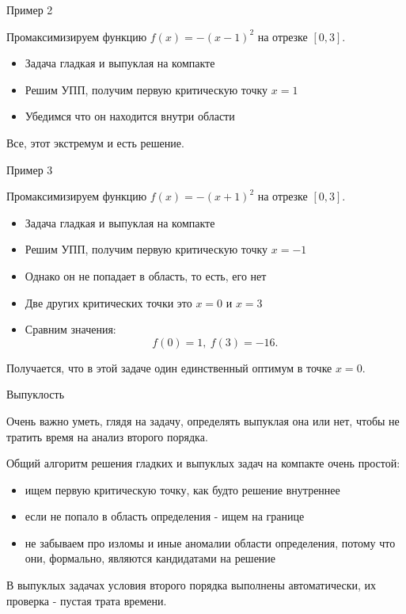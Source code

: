 \documentclass{beamer}
\begin{document}
\begin{frame}{Пример 2}

Промаксимизируем функцию $f(x) = -(x-1)^2$ на отрезке $[0,3]$.

\begin{itemize}
  \item Задача гладкая и выпуклая на компакте
  \item Решим УПП, получим первую критическую точку $x = 1$
  \item Убедимся что он находится внутри области
\end{itemize}

Все, этот экстремум и есть решение.

\end{frame}

\begin{frame}{Пример 3}

Промаксимизируем функцию $f(x) = -(x+1)^2$ на отрезке $[0,3]$.

\begin{itemize}
  \item Задача гладкая и выпуклая на компакте
  \item Решим УПП, получим первую критическую точку $x = -1$
  \item Однако он не попадает в область, то есть, его нет
  \item Две других критических точки это $x = 0$ и $x = 3$
  \item Сравним значения: $$f(0) = 1, \ f(3) = -16.$$
\end{itemize}

Получается, что в этой задаче один единственный оптимум в точке $x = 0$.

\end{frame}

\begin{frame}{Выпуклость}

Очень важно уметь, глядя на задачу, определять выпуклая она или нет, чтобы не тратить время на анализ второго порядка. 

Общий алгоритм решения гладких и выпуклых задач на компакте очень простой:

\begin{itemize}
\item ищем первую критическую точку, как будто решение внутреннее
\item если не попало в область определения - ищем на границе
\item не забываем про изломы и иные аномалии области определения, потому что они, формально, являются кандидатами на решение
\end{itemize}

\alert{В выпуклых задачах условия второго порядка выполнены автоматически}, их проверка - пустая трата времени.

\end{frame}
\end{document}
